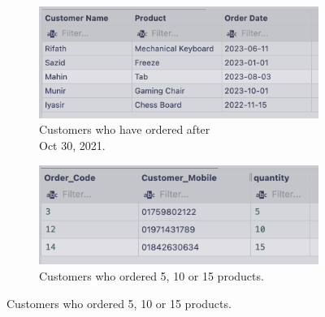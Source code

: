 \begin{figure}[H]
\begin{subfigure}{.5\textwidth}
    \end{subfigure}
    \begin{subfigure}{.5\textwidth}
        \centering
        \includegraphics[width=.8\linewidth]{images/output/q5.png}
        \caption[breakanywhere]{Customers who have ordered after\\ Oct 30, 2021.}
        \label{fig:expo3}
    \end{subfigure}
    \begin{subfigure}{1\textwidth}
        \centering
        \includegraphics[width=.8\linewidth]{images/output/q6.png}
        \caption{Customers who ordered 5, 10 or 15 products.}
        \label{fig:expo3}
    \end{subfigure}
    \label{fig:expo}
\end{figure}